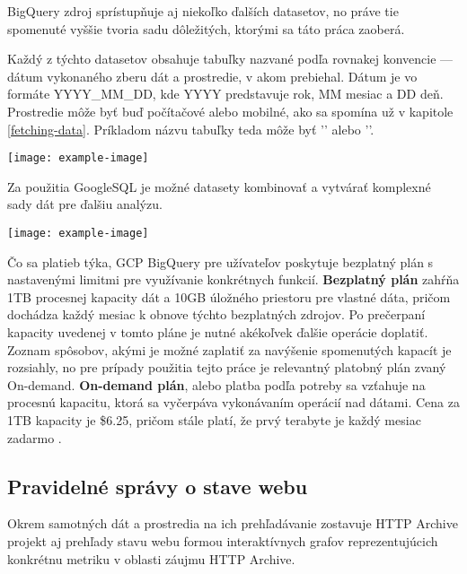 BigQuery zdroj  sprístupňuje aj niekoľko ďalších datasetov, no práve tie spomenuté vyššie tvoria sadu dôležitých, ktorými sa táto práca zaoberá. 

Každý z týchto datasetov obsahuje tabuľky nazvané podľa rovnakej konvencie --- dátum vykonaného zberu dát a prostredie, v akom prebiehal.
Dátum je vo formáte YYYY\_MM\_DD, kde YYYY predstavuje rok, MM mesiac a DD deň. Prostredie môže byť buď počítačové alebo mobilné, ako sa spomína už v kapitole \ref{fetching-data}.
Príkladom názvu tabuľky teda môže byť '' alebo ''.

\begin{center}
\noindent\texttt{[image: example-image]}    
\end{center}

\pagebreak

Za použitia GoogleSQL je možné datasety kombinovať a vytvárať komplexné sady dát pre ďalšiu analýzu.

\begin{center}
\noindent\texttt{[image: example-image]}    
\end{center}

Čo sa platieb týka, GCP BigQuery pre užívateľov poskytuje bezplatný plán s nastavenými limitmi pre využívanie konkrétnych funkcií.
\textbf{Bezplatný plán} zahŕňa 1TB procesnej kapacity dát a 10GB úložného priestoru pre vlastné dáta, pričom dochádza každý mesiac k obnove týchto bezplatných zdrojov.
Po prečerpaní kapacity uvedenej v tomto pláne je nutné akékoľvek ďalšie operácie doplatiť.
Zoznam spôsobov, akými je možné zaplatiť za navýšenie spomenutých kapacít je rozsiahly, no pre prípady použitia tejto práce je relevantný platobný plán zvaný On-demand.
\textbf{On-demand plán}, alebo platba podľa potreby sa vzťahuje na procesnú kapacitu, ktorá sa vyčerpáva vykonávaním operácií nad dátami.
Cena za 1TB kapacity je \$6.25, pričom stále platí, že prvý terabyte je každý mesiac zadarmo \cite{google-bq-pricing}.

\subsection{Pravidelné správy o stave webu}

Okrem samotných dát a prostredia na ich prehľadávanie zostavuje HTTP Archive projekt aj prehľady stavu webu formou interaktívnych grafov reprezentujúcich konkrétnu metriku v oblasti záujmu HTTP Archive.

